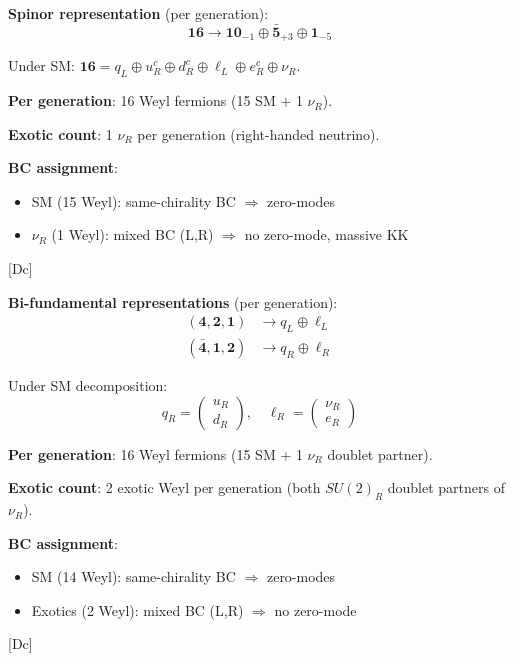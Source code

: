 \documentclass[11pt,a4paper]{article}
\newcommand{\tagDc}{\textcolor{blue!50!black}{[Dc]}}
\begin{document}
\begin{trackbox}
\textbf{Spinor representation} (per generation):
\begin{equation}
\label{eq:so10-16}
\mathbf{16} \to \mathbf{10}_{-1} \oplus \bar{\mathbf{5}}_{+3} \oplus \mathbf{1}_{-5}
\end{equation}

Under SM: $\mathbf{16} = q_L \oplus u_R^c \oplus d_R^c \oplus \ell_L \oplus e_R^c \oplus \nu_R$.

\textbf{Per generation}: 16 Weyl fermions (15 SM + 1 $\nu_R$).

\textbf{Exotic count}: 1 $\nu_R$ per generation (right-handed neutrino).

\textbf{BC assignment}:
\begin{itemize}
    \item SM (15 Weyl): same-chirality BC $\Rightarrow$ zero-modes
    \item $\nu_R$ (1 Weyl): mixed BC (L,R) $\Rightarrow$ no zero-mode, massive KK
\end{itemize}
\tagDc
\end{trackbox}

\begin{trackbox}
\textbf{Bi-fundamental representations} (per generation):
\begin{align}
\label{eq:ps-421}
(\mathbf{4}, \mathbf{2}, \mathbf{1}) &\to q_L \oplus \ell_L \\
\label{eq:ps-412}
(\bar{\mathbf{4}}, \mathbf{1}, \mathbf{2}) &\to q_R \oplus \ell_R
\end{align}

Under SM decomposition:
\begin{equation}
\label{eq:ps-sm}
q_R = \begin{pmatrix} u_R \\ d_R \end{pmatrix}, \quad
\ell_R = \begin{pmatrix} \nu_R \\ e_R \end{pmatrix}
\end{equation}

\textbf{Per generation}: 16 Weyl fermions (15 SM + 1 $\nu_R$ doublet partner).

\textbf{Exotic count}: 2 exotic Weyl per generation (both $SU(2)_R$ doublet partners of $\nu_R$).

\textbf{BC assignment}:
\begin{itemize}
    \item SM (14 Weyl): same-chirality BC $\Rightarrow$ zero-modes
    \item Exotics (2 Weyl): mixed BC (L,R) $\Rightarrow$ no zero-mode
\end{itemize}
\tagDc
\end{trackbox}
\end{document}
